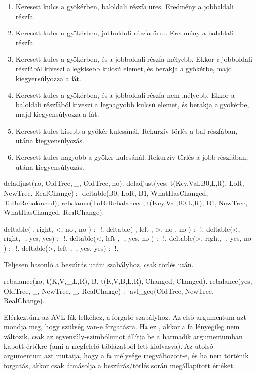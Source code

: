 \begin{enumerate}
\item Keresett kulcs a gyökérben, baloldali részfa
  üres. Eredmény a jobboldali részfa.
\item Keresett kulcs a gyökérben, jobboldali részfa
  üres. Eredmény a baloldali részfa.
\item Keresett kulcs a gyökérben, és a jobboldali
  részfa mélyebb. Ekkor a jobboldali részfából
  kiveszi a legkisebb kulcsú elemet, és berakja a
  gyökérbe, majd kiegyensúlyozza a fát.
\item Keresett kulcs a gyökérben, és a jobboldali
  részfa nem mélyebb. Ekkor a baloldali részfából
  kiveszi a legnagyobb kulcsú elemet, és berakja a
  gyökérbe, majd kiegyensúlyozza a fát.
\item Keresett kulcs kisebb a gyökér
  kulcsánál. Rekurzív törlés a bal részfában, utána
  kiegyensúlyozás.
\item Keresett kulcs nagyobb a gyökér
  kulcsánál. Rekurzív törlés a jobb részfában, utána
  kiegyensúlyozás.
\end{enumerate}

\begin{program*}
deladjust(no, OldTree, _, OldTree, no).
deladjust(yes, t(Key,Val,B0,L,R), LoR,
          NewTree, RealChange) :-
    deltable(B0, LoR, B1,
             WhatHasChanged, ToBeRebalanced),
    rebalance(ToBeRebalanced, t(Key,Val,B0,L,R), B1,
              NewTree, WhatHasChanged, RealChange).

deltable(-, right, <, no , no ) :- !.
deltable(-, left , >, no , no ) :- !.
deltable(<, right, -, yes, yes) :- !.
deltable(<, left , -, yes, no ) :- !.
deltable(>, right, -, yes, no ) :- !.
deltable(>, left , -, yes, yes) :- !.
\end{program*}
Teljesen hasonló a beszúrás utáni 
szabályhoz, csak törlés után.

\begin{program*}
rebalance(no, t(K,V,_,L,R), B, t(K,V,B,L,R),
          Changed, Changed).
rebalance(yes, OldTree, _, NewTree,
          _, RealChange) :-
    avl_geq(OldTree, NewTree, RealChange).
\end{program*}
Elérkeztünk az AVL-fák lelkéhez, a forgató
 szabályhoz. Az első argumentum azt
mondja meg, hogy szükség van-e forgatásra. Ha ez
, akkor a fa lényegileg nem változik, csak az
egyensúly-szimbólumot állítja be a harmadik
argumentumban kapott értékre (ami a megfelelő
táblázatból lett kiolvasva). Az utolsó argumentum
azt mutatja, hogy a fa mélysége megváltozott-e, és
ha nem történik forgatás, akkor csak átmásolja a
beszúrás/törlés során megállapított értéket.

